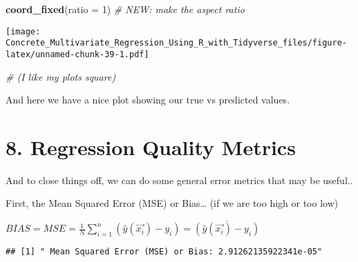 \documentclass[]{article}
\newenvironment{Shaded}{\begin{snugshade}}{\end{snugshade}}
\newcommand{\CommentTok}[1]{\textcolor[rgb]{0.56,0.35,0.01}{\textit{#1}}}
\newcommand{\DataTypeTok}[1]{\textcolor[rgb]{0.13,0.29,0.53}{#1}}
\newcommand{\DecValTok}[1]{\textcolor[rgb]{0.00,0.00,0.81}{#1}}
\newcommand{\KeywordTok}[1]{\textcolor[rgb]{0.13,0.29,0.53}{\textbf{#1}}}
\newcommand{\NormalTok}[1]{#1}
\newcommand{\OperatorTok}[1]{\textcolor[rgb]{0.81,0.36,0.00}{\textbf{#1}}}
\newcommand{\StringTok}[1]{\textcolor[rgb]{0.31,0.60,0.02}{#1}}
\begin{document}
\begin{Shaded}
\begin{Highlighting}[]
\StringTok{  }\KeywordTok{coord_fixed}\NormalTok{(}\DataTypeTok{ratio =} \DecValTok{1}\NormalTok{)           }\CommentTok{# NEW: make the aspect ratio }
\end{Highlighting}
\end{Shaded}

\texttt{[image: Concrete\_Multivariate\_Regression\_Using\_R\_with\_Tidyverse\_files/figure-latex/unnamed-chunk-39-1.pdf]}

\begin{Shaded}
\begin{Highlighting}[]
                                   \CommentTok{#   (I like my plots square)}
\end{Highlighting}
\end{Shaded}

And here we have a nice plot showing our true vs predicted values.

\hypertarget{regression-quality-metrics}{%
\section{8. Regression Quality
Metrics}\label{regression-quality-metrics}}

And to close things off, we can do some general error metrics that may
be useful..

First, the Mean Squared Error (MSE) or Bias\ldots{} (if we are too high
or too low)

\(BIAS = MSE = \frac{1}{N} \sum_{i=1}^{n} (\widehat{y}(\overrightarrow{x_i})-y_i) = \overline{(\widehat{y}(\overrightarrow{x_i})-y_i)}\)

\begin{Shaded}
\end{Shaded}

\begin{verbatim}
## [1] " Mean Squared Error (MSE) or Bias: 2.91262135922341e-05"
\end{verbatim}
\end{document}
